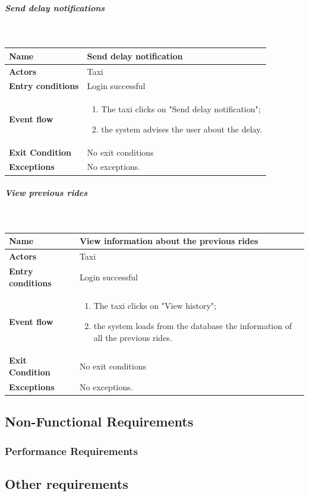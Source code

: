 \newpage
\subparagraph{Send delay notifications}
~\\[0.2cm]
\vspace{20pt}
\noindent
\begin{tabular}{l l}
 \textbf {Name} & Send delay notification  \\ \hline
 \textbf{Actors} & Taxi \\ \hline
 \textbf{Entry conditions} & Login successful \\ \hline
 \textbf{Event flow} & 
 \parbox{0.7\textwidth}{
 \begin{enumerate}
 \item The taxi clicks on "Send delay notification";
 \item the system advises the user about the delay.
 \end{enumerate}
 } \\ \hline
 \textbf{Exit Condition} & No exit conditions \\ \hline
 \textbf{Exceptions} & No exceptions.
\end{tabular}

\subparagraph{View previous rides}
~\\[0.2cm]
\vspace{20pt}
\noindent
\begin{tabular}{l l}
 \textbf {Name} & View information about the previous rides  \\ \hline
 \textbf{Actors} & Taxi \\ \hline
 \textbf{Entry conditions} & Login successful \\ \hline
 \textbf{Event flow} & 
 \parbox{0.7\textwidth}{
 \begin{enumerate}
 \item The taxi clicks on "View history";
 \item the system loads from the database the information of all the previous rides.
 \end{enumerate}
 } \\ \hline
 \textbf{Exit Condition} & No exit conditions \\ \hline
 \textbf{Exceptions} & No exceptions.
\end{tabular}

	\subsection{Non-Functional Requirements}
		\subsubsection{Performance Requirements}
	\subsection{Other requirements}